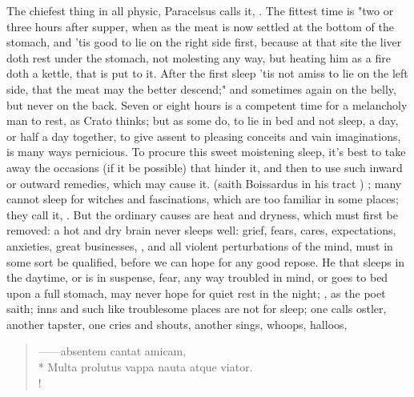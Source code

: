 {The chiefest thing in all physic, Paracelsus calls it, . The fittest time is "two or three hours after supper, when as the meat is now settled at the bottom of the stomach, and 'tis good to lie on the right side first, because at that site the liver doth rest under the stomach, not molesting any way, but heating him as a fire doth a kettle, that is put to it. After the first sleep 'tis not amiss to lie on the left side, that the meat may the better descend;" and sometimes again on the belly, but never on the back. Seven or eight hours is a competent time for a melancholy man to rest, as Crato thinks; but as some do, to lie in bed and not sleep, a day, or half a day together, to give assent to pleasing conceits and vain imaginations, is many ways pernicious. To procure this sweet moistening sleep, it's best to take away the occasions (if it be possible) that hinder it, and then to use such inward or outward remedies, which may cause it.  (saith Boissardus in his tract ) ; many cannot sleep for witches and fascinations, which are too familiar in some places; they call it, . But the ordinary causes are heat and dryness, which must first be removed: a hot and dry brain never sleeps well: grief, fears, cares, expectations, anxieties, great businesses, , and all violent perturbations of the mind, must in some sort be qualified, before we can hope for any good repose. He that sleeps in the daytime, or is in suspense, fear, any way troubled in mind, or goes to bed upon a full stomach, may never hope for quiet rest in the night; , as the poet saith; inns and such like troublesome places are not for sleep; one calls ostler, another tapster, one cries and shouts, another sings, whoops, halloos,

\begin{latin}
\begin{verse}%
------absentem cantat amicam,\\*
Multa prolutus vappa nauta atque viator.\\!
\end{verse}%
\end{latin}

}
